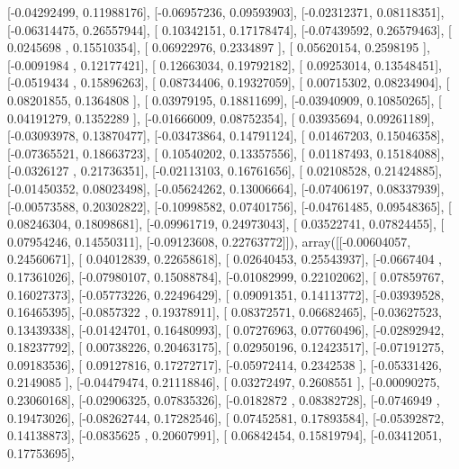 \documentclass{article}
\begin{document}
       [-0.04292499,  0.11988176],
       [-0.06957236,  0.09593903],
       [-0.02312371,  0.08118351],
       [-0.06314475,  0.26557944],
       [ 0.10342151,  0.17178474],
       [-0.07439592,  0.26579463],
       [ 0.0245698 ,  0.15510354],
       [ 0.06922976,  0.2334897 ],
       [ 0.05620154,  0.2598195 ],
       [-0.0091984 ,  0.12177421],
       [ 0.12663034,  0.19792182],
       [ 0.09253014,  0.13548451],
       [-0.0519434 ,  0.15896263],
       [ 0.08734406,  0.19327059],
       [ 0.00715302,  0.08234904],
       [ 0.08201855,  0.1364808 ],
       [ 0.03979195,  0.18811699],
       [-0.03940909,  0.10850265],
       [ 0.04191279,  0.1352289 ],
       [-0.01666009,  0.08752354],
       [ 0.03935694,  0.09261189],
       [-0.03093978,  0.13870477],
       [-0.03473864,  0.14791124],
       [ 0.01467203,  0.15046358],
       [-0.07365521,  0.18663723],
       [ 0.10540202,  0.13357556],
       [ 0.01187493,  0.15184088],
       [-0.0326127 ,  0.21736351],
       [-0.02113103,  0.16761656],
       [ 0.02108528,  0.21424885],
       [-0.01450352,  0.08023498],
       [-0.05624262,  0.13006664],
       [-0.07406197,  0.08337939],
       [-0.00573588,  0.20302822],
       [-0.10998582,  0.07401756],
       [-0.04761485,  0.09548365],
       [ 0.08246304,  0.18098681],
       [-0.09961719,  0.24973043],
       [ 0.03522741,  0.07824455],
       [ 0.07954246,  0.14550311],
       [-0.09123608,  0.22763772]]), array([[-0.00604057,  0.24560671],
       [ 0.04012839,  0.22658618],
       [ 0.02640453,  0.25543937],
       [-0.0667404 ,  0.17361026],
       [-0.07980107,  0.15088784],
       [-0.01082999,  0.22102062],
       [ 0.07859767,  0.16027373],
       [-0.05773226,  0.22496429],
       [ 0.09091351,  0.14113772],
       [-0.03939528,  0.16465395],
       [-0.0857322 ,  0.19378911],
       [ 0.08372571,  0.06682465],
       [-0.03627523,  0.13439338],
       [-0.01424701,  0.16480993],
       [ 0.07276963,  0.07760496],
       [-0.02892942,  0.18237792],
       [ 0.00738226,  0.20463175],
       [ 0.02950196,  0.12423517],
       [-0.07191275,  0.09183536],
       [ 0.09127816,  0.17272717],
       [-0.05972414,  0.2342538 ],
       [-0.05331426,  0.2149085 ],
       [-0.04479474,  0.21118846],
       [ 0.03272497,  0.2608551 ],
       [-0.00090275,  0.23060168],
       [-0.02906325,  0.07835326],
       [-0.0182872 ,  0.08382728],
       [-0.0746949 ,  0.19473026],
       [-0.08262744,  0.17282546],
       [ 0.07452581,  0.17893584],
       [-0.05392872,  0.14138873],
       [-0.0835625 ,  0.20607991],
       [ 0.06842454,  0.15819794],
       [-0.03412051,  0.17753695],
\end{document}
